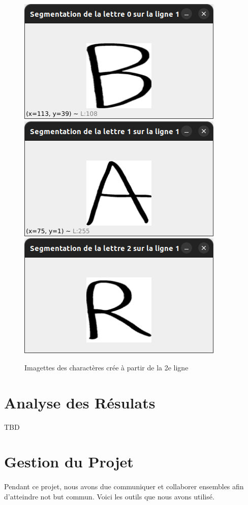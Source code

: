 \documentclass[a4paper]{article}
\begin{document}
			\begin{figure}
				\includegraphics[scale=.3]{segmentation_B.png}
				\centering
				\includegraphics[scale=.3]{segmentation_A.png}
				\centering
				\includegraphics[scale=.3]{segmentation_R.png}
				\centering
				\caption{Imagettes des charactères crée à partir de la 2e ligne}
			\end{figure}
	\newpage
	\section{Analyse des Résulats}
		TBD
	\section{Gestion du Projet}
		\paragraph{} Pendant ce projet, nous avons due communiquer et collaborer ensembles afin d'atteindre not but commun. Voici les outils que nous avons utilisé.
\end{document}
